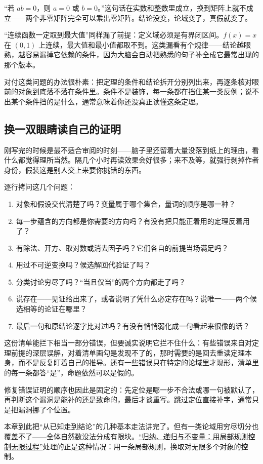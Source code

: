 ``若 \(ab=0\)，则 \(a=0\) 或 \(b=0\)。''这句话在实数和整数里成立，换到矩阵上就不成立——两个非零矩阵完全可以乘出零矩阵。结论没变，论域变了，真假就变了。

``连续函数一定取到最大值''同样漏了前提：定义域必须是有界闭区间。\(f(x)=x\) 在 \((0,1)\) 上连续，最大值和最小值都取不到。这类漏看有个规律——结论越眼熟，越容易漏掉它依赖的条件，因为大脑会自动把熟悉的句子补全成它最常出现的那个版本。

对付这类问题的办法很朴素：把定理的条件和结论拆开分别列出来，再逐条核对眼前的对象到底落不落在条件里。条件不是装饰，每一条都在挡住某一类反例；说不出某个条件挡的是什么，通常意味着你还没真正读懂这条定理。

\subsection{换一双眼睛读自己的证明}

刚写完的时候是最不适合审阅的时刻——脑子里还留着大量没落到纸上的理由，看什么都觉得理所当然。隔几个小时再读效果会好很多；来不及等，就强行剥掉作者身份，假装这是别人交上来要你挑错的东西。

逐行拷问这几个问题：

\begin{enumerate}
\tightlist
\item
  对象和假设交代清楚了吗？变量属于哪个集合，量词的顺序是哪一种？
\item
  每一步蕴含的方向都是你需要的方向吗？有没有把只能正着用的定理反着用了？
\item
  有除法、开方、取对数或消去因子吗？它们各自的前提当场满足吗？
\item
  用过不可逆变换吗？候选解回代验证了吗？
\item
  分类讨论穷尽了吗？``当且仅当''的两个方向都走了吗？
\item
  说存在——见证给出来了，或者说明了凭什么必定存在吗？说唯一——两个候选相等的论证在哪里？
\item
  最后一句和原结论逐字比对过吗？有没有悄悄弱化成一句看起来很像的话？
\end{enumerate}

这份清单能拦下相当一部分错误，但要诚实说明它拦不住什么：有些错误来自对定理前提的深层误解，对着清单画勾是发现不了的，那时需要的是回去重读定理本身，而不是反复盯着自己的推导。还有一些错误只在特定的论域里才现形，清单里的每一条都答``是''，命题依然可以是假的。

修复错误证明的顺序也因此是固定的：先定位是哪一步不合法或哪一句被默认了，再判断这个漏洞是能补的还是致命的，最后才谈重写。跳过定位直接补字，通常只是把漏洞挪了个位置。

本章到此把``从已知走到结论''的几种基本走法讲完了。但有一类论域用穷尽切分也覆盖不了——全体自然数没法分成有限块。\hyperref[ch:007]{``归纳、递归与不变量：用局部规则控制无限过程''}处理的正是这种情况：用一条局部规则，换取对无限多个对象的控制。
